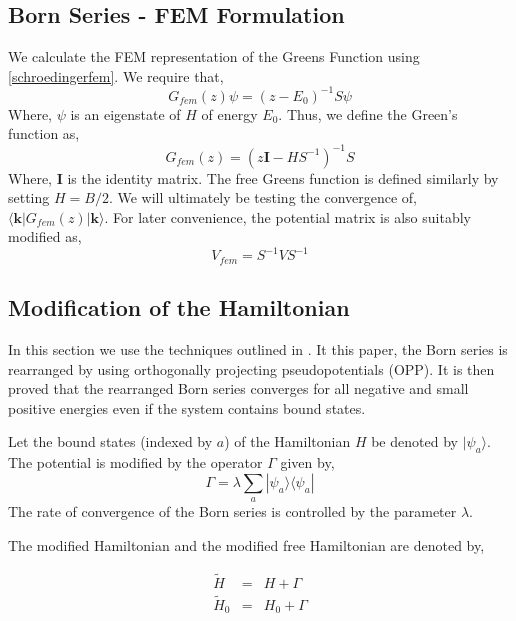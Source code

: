 \documentclass[a4paper,10pt]{report}
\begin{document}
\subsection{Born Series - FEM Formulation}
We calculate the FEM representation of the Greens Function using \eqref{schroedingerfem}. We require that,
\begin{equation}\label{greenfemreq}
 G_{fem}(z)\psi=(z-E_0)^{-1}S\psi
\end{equation}
\noindent Where, $\psi$ is an eigenstate of $H$ of energy $E_0$. Thus, we define the Green's function as,
\begin{equation}\label{greenfemdef}
 G_{fem}(z)=\left(z\mathbf{I}-HS^{-1}\right)^{-1}S
\end{equation}
\noindent Where, $\mathbf{I}$ is the identity matrix. The free Greens function is defined similarly by setting
$H=B/2$. We will ultimately be testing the convergence of, $\langle\mathbf{k}|G_{fem}(z)|\mathbf{k}\rangle$.
For later convenience, the potential matrix is also suitably modified as,
\begin{equation}\label{potmat}
 V_{fem}=S^{-1}VS^{-1}
\end{equation}


\subsection{Modification of the Hamiltonian}
In this section we use the techniques outlined in \cite{KukPom76}. It this paper, the Born
series is rearranged by using orthogonally projecting pseudopotentials (OPP). It is then
proved that the rearranged Born series converges for all negative and small positive energies
even if the system contains bound states.

Let the bound states (indexed by $a$) of the Hamiltonian $H$ be denoted by $|\psi_a\rangle$.
The potential is modified by the operator $\Gamma$ given by,
\begin{equation}\label{potmod}
  \Gamma=\lambda\displaystyle\sum_a |\psi_a\rangle\langle\psi_a|
\end{equation}
\noindent The rate of convergence of the Born series is controlled by the parameter $\lambda$.

The modified Hamiltonian and the modified free Hamiltonian are denoted by,

\begin{eqnarray}
 \widetilde{H}&=&H+\Gamma\\
 \widetilde{H}_0&=&H_0+\Gamma
\end{eqnarray}
\end{document}
